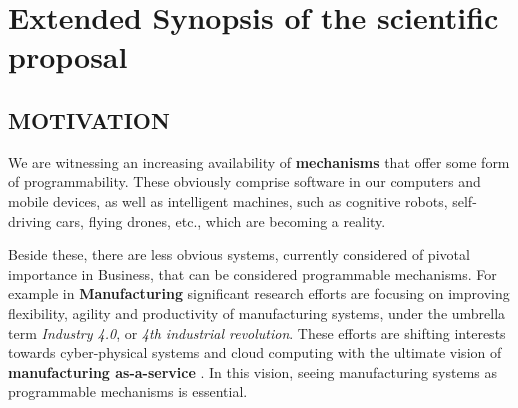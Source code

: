 \section{Extended Synopsis of the scientific proposal}





\subsection*{MOTIVATION}



We are witnessing an increasing availability of \textbf{mechanisms} that offer
some form of programmability. 
These obviously comprise software in our computers and mobile devices,
as well as
intelligent machines, such as cognitive robots, self-driving cars, flying drones, etc., which are becoming a reality. 

Beside these,  there are less obvious systems, currently considered of pivotal importance in Business, that can be considered programmable mechanisms. For
example in \textbf{Manufacturing} significant research efforts are focusing on
improving flexibility, agility and productivity of manufacturing
systems, under the umbrella term \emph{Industry 4.0}, or \emph{4th industrial
revolution}. These efforts are shifting interests towards
cyber-physical systems and cloud computing
with the ultimate vision of \textbf{manufacturing as-a-service} 
\autocite[]{Lorenz15}. 
In this vision, seeing manufacturing systems
as programmable mechanisms is essential.


